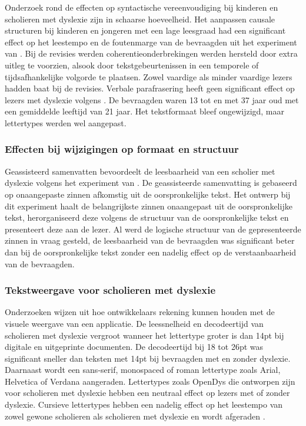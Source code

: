 Onderzoek rond de effecten op syntactische vereenvoudiging bij kinderen en scholieren met dyslexie zijn in schaarse hoeveelheid. Het aanpassen causale structuren bij kinderen en jongeren met een lage leesgraad had een significant effect op het leestempo en de foutenmarge van de bevraagden uit het experiment van \textcite{Linderholm2000}. Bij de revisies werden coherentieonderbrekingen werden hersteld door extra uitleg te voorzien, alsook door tekstgebeurtenissen in een temporele of tijdsafhankelijke volgorde te plaatsen. Zowel vaardige als minder vaardige lezers hadden baat bij de revisies. Verbale parafrasering heeft geen significant effect op lezers met dyslexie volgens \textcite{Rello2013c}. De bevraagden waren 13 tot en met 37 jaar oud met een gemiddelde leeftijd van 21 jaar. Het tekstformaat bleef ongewijzigd, maar lettertypes werden wel aangepast. 

\subsubsection{Effecten bij wijzigingen op formaat en structuur}

Geassisteerd samenvatten bevoordeelt de leesbaarheid van een scholier met dyslexie volgens het experiment van \textcite{Nandhini2013}. De geassisteerde samenvatting is gebaseerd op onaangepaste zinnen afkomstig uit de oorspronkelijke tekst. Het ontwerp bij dit experiment haalt de belangrijkste zinnen onaangepast uit de oorspronkelijke tekst, herorganiseerd deze volgens de structuur van de oorspronkelijke tekst en presenteert deze aan de lezer. Al werd de logische structuur van de gepresenteerde zinnen in vraag gesteld, de leesbaarheid van de bevraagden was significant beter dan bij de oorspronkelijke tekst zonder een nadelig effect op de verstaanbaarheid van de bevraagden.

\subsubsection{Tekstweergave voor scholieren met dyslexie}

Onderzoeken wijzen uit hoe ontwikkelaars rekening kunnen houden met de visuele weergave van een applicatie. De leessnelheid en decodeertijd van scholieren met dyslexie vergroot wanneer het lettertype groter is dan 14pt bij digitale en uitgeprinte documenten. De decodeertijd bij 18 tot 26pt was significant sneller dan teksten met 14pt bij bevraagden met en zonder dyslexie. Daarnaast wordt een sans-serif, monospaced of roman lettertype zoals Arial, Helvetica of Verdana aangeraden. Lettertypes zoals OpenDys die ontworpen zijn voor scholieren met dyslexie hebben een neutraal effect op lezers met of zonder dyslexie. Cursieve lettertypes hebben een nadelig effect op het leestempo van zowel gewone scholieren als scholieren met dyslexie en wordt afgeraden \autocite{Rello2013b, Rello2015}.

